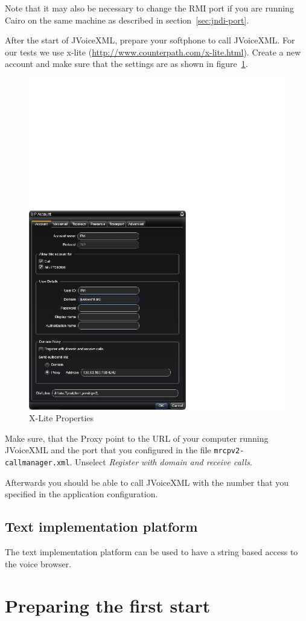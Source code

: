 \documentclass[11pt,a4paper]{article}
\begin{document}
Note that it may also be necessary to change the RMI port if you are running
Cairo on the same machine as described in section~\ref{sec:jndi-port}.

After the start of JVoiceXML, prepare your softphone to call JVoiceXML.
For our
tests we use x-lite (\url{http://www.counterpath.com/x-lite.html}).
Create a new account and make
sure that the settings are as shown in figure~\ref{fig:sip-properties}.
\begin{figure}
\begin{center}
\includegraphics[width=.5\linewidth]{SIPProperties}
\end{center}
\caption{X-Lite Properties}
\label{fig:sip-properties}
\end{figure}
Make sure, that the Proxy point to the URL of your computer running JVoiceXML
and the port that you configured in the file \texttt{mrcpv2-callmanager.xml}. 
Unselect \emph{Register with domain and receive calls}.

Afterwards you should be able to call JVoiceXML with the number that you
specified in the application configuration.

\subsection{Text implementation platform}

The text implementation platform can be used to have a string based access to
the voice browser.

\section{Preparing the first start}
\label{sec:impl-platform-config}
\end{document}
